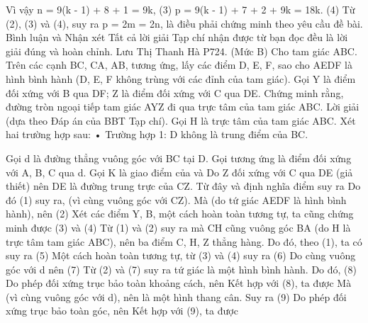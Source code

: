 \begin{multicols}{2}
{	
	Vì vậy
	n = 9(k - 1) + 8 + 1 = 9k,                                                          (3)
	p = 9(k - 1) + 7 + 2 + 9k = 18k.                                                     (4)
	Từ (2), (3) và (4), suy ra p = 2m = 2n, là điều phải chứng minh theo yêu cầu đề bài.
	Bình luận và Nhận xét
	Tất cả lời giải Tạp chí nhận được từ bạn đọc đều là lời giải đúng và hoàn chỉnh.
	Lưu Thị Thanh Hà
	P724. (Mức B) Cho tam giác ABC. Trên các cạnh BC, CA, AB, tương ứng, lấy các điểm D, E, F, sao cho AEDF là hình bình hành (D, E, F không trùng với các đỉnh của tam giác). Gọi Y là điểm đối xứng với B qua DF; Z là điểm đối xứng với C qua DE. Chứng minh rằng, đường tròn ngoại tiếp tam giác AYZ đi qua trực tâm của tam giác ABC.
	Lời giải (dựa theo Đáp án của BBT Tạp chí).
	Gọi H là trực tâm của tam giác ABC.
	Xét hai trường hợp sau:
	• Trường hợp 1: D không là trung điểm của BC.
	
	Gọi d là đường thẳng vuông góc với BC tại D. Gọi   tương ứng là điểm đối xứng với A, B, C qua d. Gọi K là giao điểm của   và  
	Do Z đối xứng với C qua DE (giả thiết) nên DE là đường trung trực của CZ. Từ đây và định nghĩa điểm   suy ra   Do đó
	(1)
	suy ra,   (vì cùng vuông góc với CZ). Mà   (do tứ giác AEDF là hình bình hành), nên                                                                                                                                           (2)
	Xét các điểm Y, B,   một cách hoàn toàn tương tự, ta cũng chứng minh được
	(3)
	và                                                                                                                                            (4)
	Từ (1) và (2) suy ra   mà CH cũng vuông góc BA (do H là trực tâm tam giác ABC), nên ba điểm C, H, Z thẳng hàng. Do đó, theo (1), ta có   suy ra                           (5)
	Một cách hoàn toàn tương tự, từ (3) và (4) suy ra                                                            (6)
	Do cùng vuông góc với d nên                                                                                                (7)
	Từ (2) và (7) suy ra tứ giác   là một hình bình hành. Do đó,                                     (8)
	Do phép đối xứng trục bảo toàn khoảng cách, nên   Kết hợp với (8), ta được   Mà   (vì cùng vuông góc với d), nên   là một hình thang cân. Suy ra
	(9)
	Do phép đối xứng trục bảo toàn góc, nên   Kết hợp với (9), ta được
	
}
\end{multicols}
